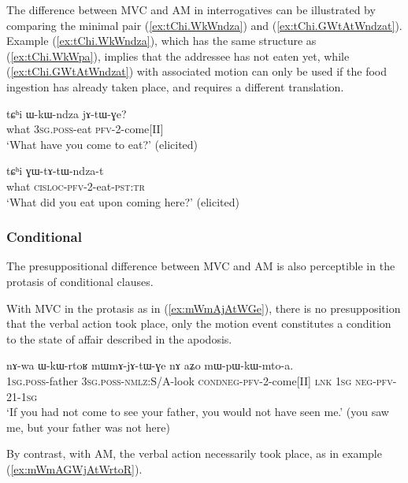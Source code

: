 The difference between MVC and AM in interrogatives can be illustrated by comparing the minimal pair  (\ref{ex:tChi.WkWndza}) and (\ref{ex:tChi.GWtAtWndzat}). Example (\ref{ex:tChi.WkWndza}), which has the same structure as (\ref{ex:tChi.WkWpa}), implies that the addressee has not eaten yet, while (\ref{ex:tChi.GWtAtWndzat}) with associated motion can only be used if the food ingestion has already taken place, and requires a different translation.

\begin{exe}
\ex \label{ex:tChi.WkWndza}
\gll tɕʰi ɯ-kɯ-ndza jɤ-tɯ-ɣe? \\
what \textsc{3sg.poss}-eat \textsc{pfv}-2-come[II] \\
\glt `What have you come to eat?' (elicited)
\end{exe}

\begin{exe}
\ex \label{ex:tChi.GWtAtWndzat}
\gll tɕʰi ɣɯ-tɤ-tɯ-ndza-t \\
what \textsc{cisloc}-\textsc{pfv}-2-eat-\textsc{pst:tr}    \\
\glt `What did you eat upon coming here?' (elicited)
\end{exe}

\subsubsection{Conditional} \label{sec:am.conditional}
The presuppositional difference between MVC and AM is also perceptible in the protasis of conditional clauses. 

With MVC in the protasis as in (\ref{ex:mWmAjAtWGe}), there is no presupposition that the verbal action took place, only the motion event constitutes a condition to the state of affair described in the apodosis.

\begin{exe}
\ex \label{ex:mWmAjAtWGe}
\gll nɤ-wa ɯ-kɯ-rtoʁ mɯ\redp{}mɤ-jɤ-tɯ-ɣe nɤ aʑo mɯ-pɯ-kɯ-mto-a. \\
\textsc{1sg.poss}-father \textsc{3sg.poss-}\textsc{nmlz}:S/A-look \textsc{cond}\redp{}\textsc{neg}-\textsc{pfv}-2-come[II] \textsc{lnk} \textsc{1sg} \textsc{neg}-\textsc{pfv}-2\fl{}1-\textsc{1sg} \\
\glt `If you had not come to see your father, you would not have seen me.' (you saw me, but your father was not here)
\end{exe}

By contrast, with AM, the verbal action necessarily took place, as in example (\ref{ex:mWmAGWjAtWrtoR}).

